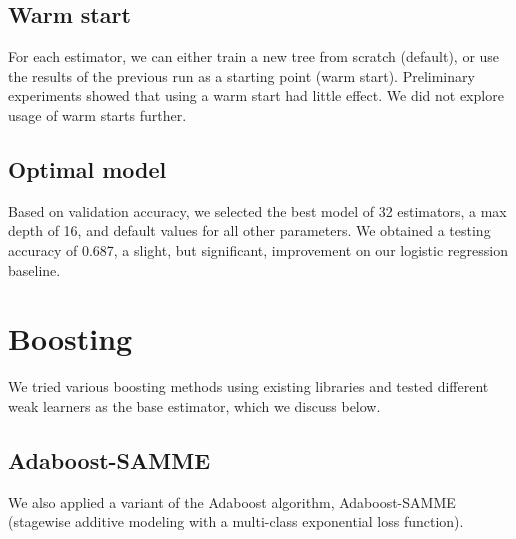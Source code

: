 \documentclass{article}
\begin{document}
\begin{multicols}{2}
\subsection{Warm start}

For each estimator,
we can either train a new tree from scratch (default),
or use the results of the previous run
as a starting point (warm start).
Preliminary experiments showed that using a warm start
had little effect.
We did not explore usage of warm starts further.

\subsection{Optimal model}

Based on validation accuracy,
we selected the best model
of 32 estimators, a max depth of 16,
and default values for all other parameters.
We obtained a testing accuracy of 0.687,
a slight, but significant, improvement
on our logistic regression baseline.

\section{Boosting}

We tried various boosting methods using existing libraries
and tested different weak learners as the base estimator,
which we discuss below.

\subsection{Adaboost-SAMME}

We also applied a variant of the Adaboost algorithm,
Adaboost-SAMME (stagewise additive modeling
with a multi-class exponential loss function).


\end{multicols}
\end{document}
